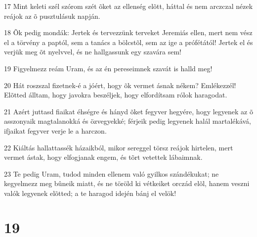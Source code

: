 \par 17 Mint keleti szél szórom szét õket az ellenség elõtt, háttal és nem arczczal nézek reájok az õ pusztulásuk napján.
\par 18 Õk pedig mondák: Jertek és tervezzünk terveket Jeremiás ellen, mert nem vész el a törvény a paptól, sem a tanács a  bölcstõl, sem az ige a prófétától! Jertek el és verjük meg õt nyelvvel, és ne hallgassunk egy szavára sem!
\par 19 Figyelmezz reám Uram, és az én pereseimnek szavát is halld meg!
\par 20 Hát roszszal fizetnek-é a jóért, hogy õk vermet ásnak nékem? Emlékezzél! Elõtted álltam, hogy javokra beszéljek, hogy elfordítsam rólok haragodat.
\par 21 Azért juttasd fiaikat éhségre és hányd õket fegyver hegyére, hogy legyenek az õ asszonyaik magtalanokká és özvegyekké; férjeik pedig legyenek halál martalékává, ifjaikat fegyver verje le a harczon.
\par 22 Kiáltás hallattassék házaikból, mikor sereggel törsz reájok hirtelen, mert vermet ástak, hogy elfogjanak engem, és tõrt vetettek lábaimnak.
\par 23 Te pedig Uram, tudod minden ellenem való gyilkos szándékukat; ne kegyelmezz meg bûneik miatt, és ne töröld ki vétkeiket orczád elõl, hanem veszni valók legyenek elõtted; a te haragod idején bánj el velök!

\chapter{19}

